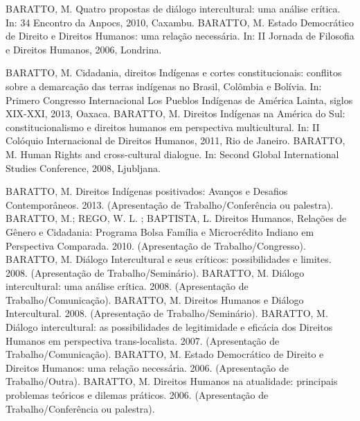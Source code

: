 
\begin{cvcitems}
  \cvcitem
    {BARATTO, M.}
    {Quatro propostas de diálogo intercultural: uma análise crítica. In: 34 Encontro da Anpocs, 2010, Caxambu.}
  \cvcitem
    {BARATTO, M.}
  {Estado Democrático de Direito e Direitos Humanos: uma relação necessária. In: II Jornada de Filosofia e Direitos Humanos, 2006, Londrina.}
\end{cvcitems}


\begin{cvcitems}
  \cvcitem
    {BARATTO, M.}
    {Cidadania, direitos Indígenas e cortes constitucionais: conflitos sobre a demarcação das terras indígenas no Brasil, Colômbia e Bolívia. In: Primero Congresso Internacional Los Pueblos Indígenas de América Lainta, siglos XIX-XXI, 2013, Oaxaca.}
  \cvcitem
    {BARATTO, M.}
    {Direitos Indígenas na América do Sul: constitucionalismo e direitos humanos em perspectiva multicultural. In: II Colóquio Internacional de Direitos Humanos, 2011, Rio de Janeiro.}
  \cvcitem
    {BARATTO, M.}
    {Human Rights and cross-cultural dialogue. In: Second Global International Studies Conference, 2008, Ljubljana.}
\end{cvcitems}


\begin{cvcitems}
  \cvcitem
    {BARATTO, M.}
    {Direitos Indígenas positivados: Avanços e Desafios Contemporâneos. 2013. (Apresentação de Trabalho/Conferência ou palestra).}
  \cvcitem
    {BARATTO, M.; REGO, W. L. ; BAPTISTA, L.}
    {Direitos Humanos, Relações de Gênero e Cidadania: Programa Bolsa Família e Microcrédito Indiano em Perspectiva Comparada. 2010. (Apresentação de Trabalho/Congresso).}
  \cvcitem
    {BARATTO, M.}
    {Diálogo Intercultural e seus críticos: possibilidades e limites. 2008. (Apresentação de Trabalho/Seminário).}
  \cvcitem
    {BARATTO, M.}
    {Diálogo intercultural: uma análise crítica. 2008. (Apresentação de Trabalho/Comunicação).}
  \cvcitem
    {BARATTO, M.}
    {Direitos Humanos e Diálogo Intercultural. 2008. (Apresentação de Trabalho/Seminário).}
  \cvcitem
    {BARATTO, M.}
    {Diálogo intercultural: as possibilidades de legitimidade e eficácia dos Direitos Humanos em perspectiva trans-localista. 2007. (Apresentação de Trabalho/Comunicação).}
  \cvcitem
    {BARATTO, M.}
    {Estado Democrático de Direito e Direitos Humanos: uma relação necessária. 2006. (Apresentação de Trabalho/Outra).}
  \cvcitem
    {BARATTO, M.}
    {Direitos Humanos na atualidade: principais problemas teóricos e dilemas práticos. 2006. (Apresentação de Trabalho/Conferência ou palestra).}
\end{cvcitems}

